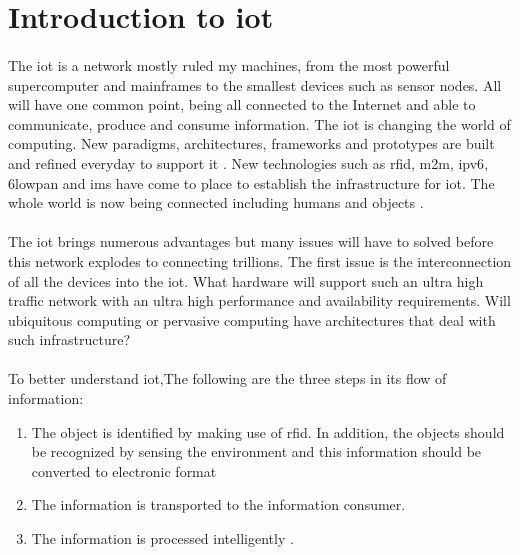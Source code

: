 \documentclass[oneside,12pt,a4paper,final]{book}
\begin{document}
\section{Introduction to \gls{iot}}
\paragraph{}
The \gls{iot} is a network mostly ruled my machines, from the most powerful supercomputer and mainframes to the smallest devices such as sensor nodes. All will have one common point, being all connected to the Internet and able to communicate, produce and consume information. The \gls{iot} is changing the world of computing. New paradigms, architectures, frameworks and prototypes are built and refined everyday to support it \cite{ref15}. New technologies such as \gls{rfid}, \gls{m2m}, \gls{ipv6}, \gls{6lowpan} and \gls{ims} have come to place to establish the infrastructure for \gls{iot}. The whole world is now being connected including humans and objects \cite{ref18}.
\paragraph{}
The \gls{iot} brings numerous advantages but many issues will have to solved before this network explodes to connecting trillions. The first issue is the interconnection of all the devices into the \gls{iot}. What hardware will support such an ultra high traffic network with an ultra high performance and availability requirements. Will ubiquitous computing or pervasive computing have architectures that deal with such infrastructure?
\paragraph{}
To better understand \gls{iot},The following are the three steps in its flow of information:
\begin{enumerate}
\item The object is identified by making use of \gls{rfid}. In addition, the objects should be recognized by sensing the environment and this information should be converted to electronic format
\item  The information is transported to the information consumer.
\item The information is processed intelligently \cite{ref17}.
\end{enumerate}
\end{document}
